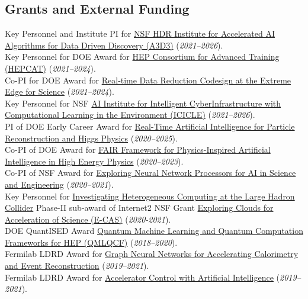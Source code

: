 \documentclass[11pt]{res}
\newcommand{\MarginText}[1]{\section{#1}\vspace{10pt}}
\begin{document}
\begin{resume}
  \MarginText{Grants and External Funding}
  Key Personnel and Institute PI for \href{https://www.nsf.gov/awardsearch/showAward?AWD_ID=2117997&HistoricalAwards=false}{NSF HDR Institute for Accelerated AI Algorithms for Data Driven Discovery (A3D3)} (\textit{2021--2026}).\\
  Key Personnel for DOE Award for \href{https://science.osti.gov/-/media/hep/pdf/Awards/HEP_instrumentation_awards_list.pdf}{HEP Consortium for Advanced Training (HEPCAT)} (\textit{2021--2024}).\\
  Co-PI for DOE Award for \href{https://science.osti.gov/-/media/ascr/pdf/funding/2021/Data_Reduction_Awards.pdf}{Real‐time Data Reduction Codesign at the Extreme Edge for Science} (\textit{2021--2024}).\\
  Key Personnel for NSF \href{https://www.nsf.gov/awardsearch/showAward?AWD_ID=2112606&HistoricalAwards=false}{AI Institute for Intelligent CyberInfrastructure with Computational Learning in the Environment (ICICLE)} (\textit{2021--2026}).\\
  PI of DOE Early Career Award for \href{https://science.osti.gov/-/media/early-career/pdf/FY20_DOE_SC_Early_Career_Research_Program_Abstracts.pdf}{Real-Time Artificial Intelligence for Particle Reconstruction and Higgs Physics} (\textit{2020--2025}).\\
  Co-PI of DOE Award for \href{https://science.osti.gov/-/media/ascr/pdf/programdocuments/docs/2020/List_of_Awards_FAIR_Data.pdf}{FAIR Framework for Physics-Inspired Artificial Intelligence in
    High Energy Physics} (\textit{2020--2023}).\\
  Co-PI of NSF Award for \href{https://nsf.gov/awardsearch/showAward?AWD_ID=2005369}{Exploring Neural Network Processors for AI in Science and Engineering} (\textit{2020--2021}).\\
  Key Personnel for \href{https://www.internet2.edu/news/detail/17957/}{Investigating Heterogeneous Computing at the Large Hadron Collider} Phase-II sub-award of Internet2 NSF Grant \href{https://www.nsf.gov/awardsearch/showAward?AWD_ID=1904444}{Exploring Clouds for Acceleration of Science (E-CAS)} (\textit{2020-2021}).\\
  DOE QuantISED Award \href{https://pamspublic.science.energy.gov/WebPAMSExternal/Interface/Common/ViewPublicAbstract.aspx?rv=1f7d4729-6f93-40bd-a55f-c108545b1ea9&rtc=24&PRoleId=10}{Quantum Machine Learning and Quantum Computation Frameworks for HEP (QMLQCF)} (\textit{2018--2020}).\\
  Fermilab LDRD Award for \href{https://ldrd.fnal.gov/subdir/FNAL-LDRD-2019-017-D1.pdf}{Graph Neural Networks for Accelerating Calorimetry and Event Reconstruction} (\textit{2019--2021}).\\
  Fermilab LDRD Award for \href{https://ldrd.fnal.gov/subdir/FNAL-LDRD-2019-027-D1.pdf}{Accelerator Control with Artificial Intelligence} (\textit{2019--2021}).


\end{resume}
\end{document}
